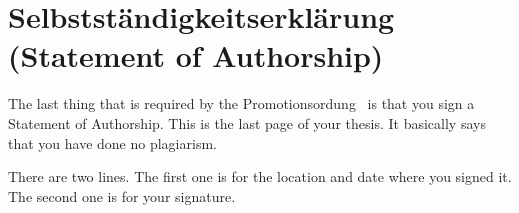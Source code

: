 \section{Selbstständigkeitserklärung (Statement of Authorship)}
The last thing that is required by the Promotionsordung~\citep{web:promotion}
is that you sign a Statement of Authorship. This is the last page of your
thesis.  It basically says that you have done no plagiarism.

There are two lines. The first one is for the location and date where you
signed it. The second one is for your signature.

